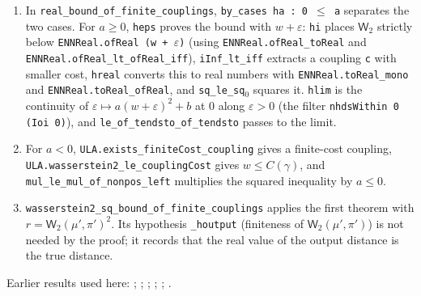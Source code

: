 \documentclass[11pt,a4paper]{article}
\begin{document}
\begin{leanbox}
\begin{enumerate}


\item In \texttt{real\_\allowbreak{}bound\_\allowbreak{}of\_\allowbreak{}finite\_\allowbreak{}couplings}, \texttt{by\_\allowbreak{}cases ha : 0 \ensuremath{\le} a} separates the two cases. For \(a\ge0\), \texttt{heps} proves the bound with \(w+\varepsilon\): \texttt{hi} places \(\mathsf W_2\) strictly below \texttt{ENNReal.\allowbreak{}of\allowbreak{}Real (w + \ensuremath{\varepsilon})} (using \texttt{ENNReal.\allowbreak{}of\allowbreak{}Real\_\allowbreak{}to\allowbreak{}Real} and \texttt{ENNReal.\allowbreak{}of\allowbreak{}Real\_\allowbreak{}lt\_\allowbreak{}of\allowbreak{}Real\_\allowbreak{}iff}), \texttt{i\allowbreak{}Inf\_\allowbreak{}lt\_\allowbreak{}iff} extracts a coupling \texttt{c} with smaller cost, \texttt{hreal} converts this to real numbers with \texttt{ENNReal.\allowbreak{}to\allowbreak{}Real\_\allowbreak{}mono} and \texttt{ENNReal.\allowbreak{}to\allowbreak{}Real\_\allowbreak{}of\allowbreak{}Real}, and \texttt{sq\_\allowbreak{}le\_\allowbreak{}sq\ensuremath{{}_{0}}} squares it. \texttt{hlim} is the continuity of \(\varepsilon\mapsto a(w+\varepsilon)^2+b\) at \(0\) along \(\varepsilon>0\) (the filter \texttt{nhds\allowbreak{}Within 0 (Ioi 0)}), and \texttt{le\_\allowbreak{}of\_\allowbreak{}tendsto\_\allowbreak{}of\_\allowbreak{}tendsto} passes to the limit.

\item For \(a<0\), \texttt{ULA.\allowbreak{}exists\_\allowbreak{}finite\allowbreak{}Cost\_\allowbreak{}coupling} gives a finite-cost coupling, \texttt{ULA.\allowbreak{}wasserstein2\_\allowbreak{}le\_\allowbreak{}coupling\allowbreak{}Cost} gives \(w\le C(\gamma)\), and \texttt{mul\_\allowbreak{}le\_\allowbreak{}mul\_\allowbreak{}of\_\allowbreak{}nonpos\_\allowbreak{}left} multiplies the squared inequality by \(a\le0\).

\item \texttt{wasserstein2\_\allowbreak{}sq\_\allowbreak{}bound\_\allowbreak{}of\_\allowbreak{}finite\_\allowbreak{}couplings} applies the first theorem with \(r=\mathsf W_2(\mu',\pi')^2\). Its hypothesis \texttt{\_\allowbreak{}houtput} (finiteness of \(\mathsf W_2(\mu',\pi')\)) is not needed by the proof; it records that the real value of the output distance is the true distance.

\end{enumerate}
\end{leanbox}


Earlier results used here: \cite[Section~3.17.1]{LangevinLean2026ULASC}; \cite[Section~3.17.2]{LangevinLean2026ULASC}; \cite[Section~3.17.3]{LangevinLean2026ULASC}; \cite[Section~3.17.4]{LangevinLean2026ULASC}; \cite[Section~3.17.5]{LangevinLean2026ULASC}; \cite[Section~3.18.2]{LangevinLean2026ULASC}.
\end{document}
